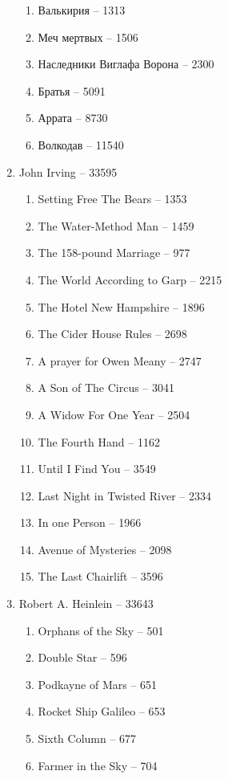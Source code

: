 \documentclass[a4paper, 11pt]{proc} %
\begin{document}
\begin{enumerate}
\begin{enumerate}
            \item Валькирия -- 1313
            \item Меч мертвых -- 1506
            \item Наследники Виглафа Ворона -- 2300
            \item Братья -- 5091
            \item Аррата -- 8730
            \item Волкодав -- 11540
        \end{enumerate}
    \item John Irving -- 33595
        \begin{enumerate}
            \item Setting Free The Bears -- 1353
            \item The Water-Method Man -- 1459
            \item The 158-pound Marriage -- 977
            \item The World According to Garp -- 2215
            \item The Hotel New Hampshire -- 1896
            \item The Cider House Rules -- 2698
            \item A prayer for Owen Meany -- 2747
            \item A Son of The Circus -- 3041
            \item A Widow For One Year -- 2504
            \item The Fourth Hand -- 1162
            \item Until I Find You -- 3549
            \item Last Night in Twisted River -- 2334
            \item In one Person -- 1966
            \item Avenue of Mysteries -- 2098
            \item The Last Chairlift -- 3596
        \end{enumerate}
    \item Robert A. Heinlein -- 33643
        \begin{enumerate}
            \item Orphans of the Sky -- 501
            \item Double Star -- 596
            \item Podkayne of Mars -- 651
            \item Rocket Ship Galileo -- 653
            \item Sixth Column -- 677
            \item Farmer in the Sky -- 704

\end{enumerate}
\end{enumerate}
\end{document}
